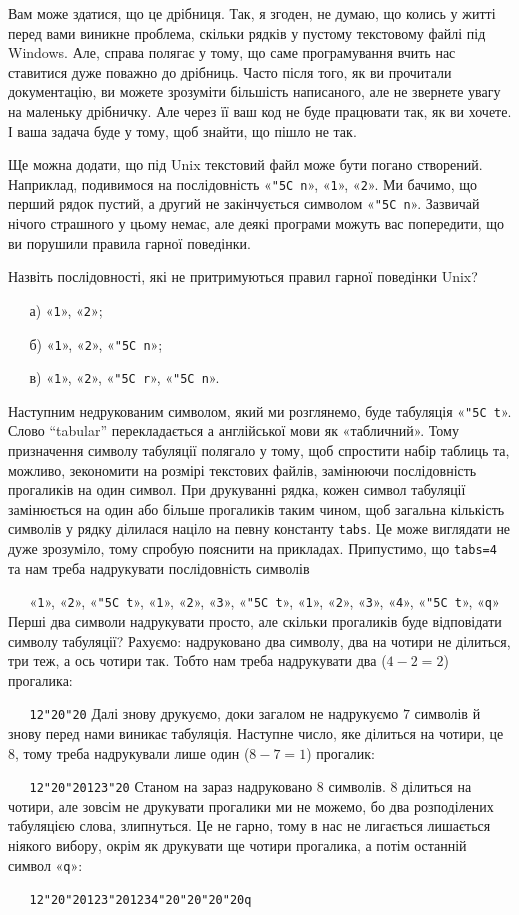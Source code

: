\documentclass{book}
\newcommand{\escape}[1]{\texttt{\char"5C #1}}
\newcommand{\textseq}[1]{\par\vbox{\texttt{~~~}#1}}
\newcommand{\id}[1]{\texttt{#1}}
\newcommand{\chr}[1]{«\texttt{#1}»}
\newcommand{\s}{\char"20}
\newcommand{\chesc}[1]{\chr{\escape{#1}}}
\begin{document}
Вам може здатися, що це дрібниця.
Так, я згоден, не думаю, що колись у житті перед вами виникне проблема, скільки рядків у пустому текстовому файлі під Windows.
Але, справа полягає у тому, що саме програмування вчить нас ставитися дуже поважно до дрібниць.
Часто після того, як ви прочитали документацію, ви можете зрозуміти більшість написаного, але не звернете увагу на маленьку дрібничку.
Але через її ваш код не буде працювати так, як ви хочете.
І ваша задача буде у тому, щоб знайти, що пішло не так.

Ще можна додати, що під Unix текстовий файл може бути погано створений.
Наприклад, подивимося на послідовність \chesc n, \chr1, \chr2.
Ми бачимо, що перший рядок пустий, а другий не закінчується символом \chesc n.
Зазвичай нічого страшного у цьому немає, але деякі програми можуть вас попередити, що ви порушили правила гарної поведінки.

\begin{exercise}
Назвіть послідовності, які не притримуються правил гарної поведінки Unix?

\textseq{а) \chr1, \chr2;}
\textseq{б) \chr1, \chr2, \chesc n;}
\textseq{в) \chr1, \chr2, \chesc r, \chesc n.}
\end{exercise}

Наступним недрукованим символом, який ми розглянемо, буде табуляція \chesc t.
Слово “tabular” перекладається а англійської мови як «табличний».
Тому призначення символу табуляції полягало у тому, щоб спростити набір таблиць та, можливо, зекономити на розмірі текстових файлів, замінюючи послідовність прогаликів на один символ.
При друкуванні рядка, кожен символ табуляції замінюється на один або більше прогаликів таким чином, щоб загальна кількість символів у рядку ділилася націло на певну константу \id{tabs}.
Це може виглядати не дуже зрозуміло, тому спробую пояснити на прикладах.
Припустимо, що \id{tabs=4} та нам треба надрукувати послідовність символів
\textseq{\chr1, \chr2, \chesc t, \chr1, \chr2, \chr3, \chesc t, \chr1, \chr2, \chr3, \chr4, \chesc t, \chr q}
Перші два символи надрукувати просто, але скільки прогаликів буде відповідати символу табуляції?
Рахуємо: надруковано два символу, два на чотири не ділиться, три теж, а ось чотири так.
Тобто нам треба надрукувати два ($4-2=2$) прогалика:
\textseq{\id{12\s\s}}
Далі знову друкуємо, доки загалом не надрукуємо $7$ символів й знову перед нами виникає табуляція.
Наступне число, яке ділиться на чотири, це $8$, тому треба надрукували лише один ($8-7=1$) прогалик:
\textseq{\id{12\s\s{}123\s}}
Станом на зараз надруковано $8$ символів.
$8$ ділиться на чотири, але зовсім не друкувати прогалики ми не можемо, бо два розподілених табуляцією слова, злипнуться.
Це не гарно, тому в нас не лигається лишається ніякого вибору, окрім як друкувати ще чотири прогалика, а потім останній символ \chr q:
\textseq{\id{12\s\s{}123\s{}1234\s\s\s\s{}q}}
\end{document}
